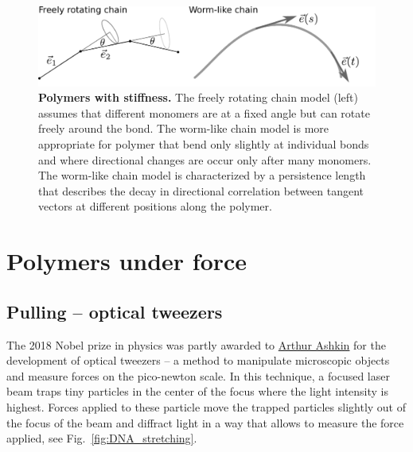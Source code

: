 \begin{figure}[tb]
	\centering
	\includegraphics[width=0.96\columnwidth]{figures/stiff_polymers.pdf}
	\caption{{\bf Polymers with stiffness.} The freely rotating chain model (left) assumes that different monomers are at a fixed angle but can rotate freely around the bond. The worm-like chain model is more appropriate for polymer that bend only slightly at individual bonds and where directional changes are occur only after many monomers. The worm-like chain model is characterized by a persistence length that describes the decay in directional correlation between tangent vectors at different positions along the polymer. }
	\label{fig:stiff_polymers}
\end{figure}



\section*{Polymers under force}




\subsection*{Pulling -- optical tweezers}
The 2018 Nobel prize in physics was partly awarded to \href{https://en.wikipedia.org/wiki/Arthur_Ashkin}{Arthur Ashkin} for the development of optical tweezers -- a method to manipulate microscopic objects and measure forces on the pico-newton scale.
In this technique, a focused laser beam traps tiny particles in the center of the focus where the light intensity is highest.
Forces applied to these particle move the trapped particles slightly out of the focus of the beam and diffract light in a way that allows to measure the force applied, see Fig.~\ref{fig:DNA_stretching}.

